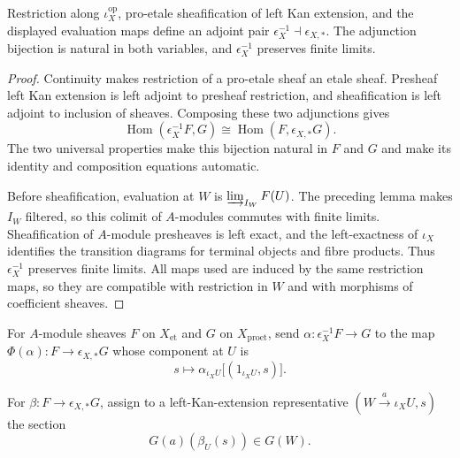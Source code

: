 \begin{lemma}
\label{lemma:weil-pbc-epsilon-geometric-morphism-construction-v1}
Restriction along $\iota_X^{\mathrm{op}}$, pro-etale sheafification of left
Kan extension, and the displayed evaluation maps define an adjoint pair
$\epsilon_X^{-1}\dashv\epsilon_{X,*}$.  The adjunction bijection is natural
in both variables, and $\epsilon_X^{-1}$ preserves finite limits.
\end{lemma}
\begin{proof}
Continuity makes restriction of a pro-etale sheaf an etale sheaf.  Presheaf
left Kan extension is left adjoint to presheaf restriction, and sheafification
is left adjoint to inclusion of sheaves.  Composing these two adjunctions gives
\[
 \operatorname{Hom}(\epsilon_X^{-1}F,G)
 \cong\operatorname{Hom}(F,\epsilon_{X,*}G).
\]
The two universal properties make this bijection natural in $F$ and $G$ and
make its identity and composition equations automatic.

Before sheafification, evaluation at $W$ is
$\varinjlim_{I_W}F(U)$.  The preceding lemma makes $I_W$ filtered, so this
colimit of $A$-modules commutes with finite limits.  Sheafification of
$A$-module presheaves is left exact, and the left-exactness of $\iota_X$
identifies the transition diagrams for terminal objects and fibre products.
Thus $\epsilon_X^{-1}$ preserves finite limits.  All maps used are induced by
the same restriction maps, so they are compatible with restriction in $W$ and
with morphisms of coefficient sheaves.
\end{proof}


\begin{definition}
\label{def:weil-efi-site-adjunction-hom-forward}
For $A$-module sheaves $F$ on $X_{\mathrm{et}}$ and $G$ on
$X_{\mathrm{proet}}$, send
$\alpha:\epsilon_X^{-1}F\to G$ to the map $\Phi(\alpha):F\to\epsilon_{X,*}G$
whose component at $U$ is
\[
 s\longmapsto
 \alpha_{\iota_XU}\bigl[(1_{\iota_XU},s)\bigr].
\]
\end{definition}

\begin{definition}
\label{def:weil-efi-site-adjunction-hom-backward-presheaf}
For $\beta:F\to\epsilon_{X,*}G$, assign to a left-Kan-extension
representative $(W\xrightarrow a\iota_XU,s)$ the section
\[
 G(a)(\beta_U(s))\in G(W).
\]
\end{definition}

